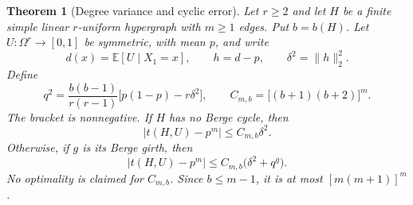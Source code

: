 \documentclass[a4paper,11pt,reqno]{amsart}
\theoremstyle{plain}
\newtheorem{theorem}{Theorem}[section]
\theoremstyle{definition}
\theoremstyle{remark}
\begin{document}
\begin{theorem}[Degree variance and cyclic error]
\label{density-almost-regular}
Let $r\ge2$ and let $H$ be a finite simple linear $r$-uniform
hypergraph with $m\ge1$ edges.  Put $b=b(H)$.  Let
$U:\Omega^r\to[0,1]$ be symmetric, with mean $p$, and write
\[
 d(x)=\mathbb E[U\mid X_1=x],\qquad
 h=d-p,\qquad \delta^2=\|h\|_2^2.
\]
Define
\[
 q^2=\frac{b(b-1)}{r(r-1)}
          \bigl[p(1-p)-r\delta^2\bigr],\qquad
 C_{m,b}=\bigl[(b+1)(b+2)\bigr]^m.
\]
The bracket is nonnegative.  If $H$ has no Berge cycle, then
\begin{equation}\label{density-almost-regular-forest}
 |t(H,U)-p^m|\le C_{m,b}\delta^2.
\end{equation}
Otherwise, if $g$ is its Berge girth, then
\begin{equation}\label{density-almost-regular-cycle}
 |t(H,U)-p^m|\le C_{m,b}\bigl(\delta^2+q^g\bigr).
\end{equation}
No optimality is claimed for $C_{m,b}$.  Since $b\le m-1$, it is
at most $[m(m+1)]^m$.
\end{theorem}
\end{document}
